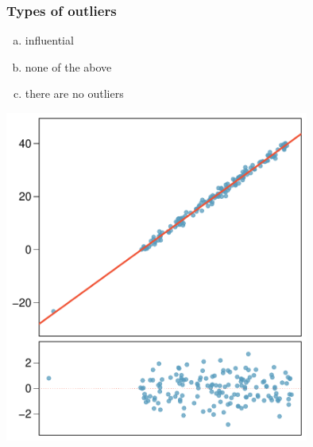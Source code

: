 \documentclass[notes,11pt, aspectratio=169]{beamer}
\begin{document}

\begin{frame}
\frametitle{Types of outliers}

{
\begin{enumerate}[(a)]
\item influential
\item none of the above
\item there are no outliers
\end{enumerate}
}
{
\begin{center}
\includegraphics[width=0.75\textwidth]{graphs/out6}
\end{center}
}

\end{frame}

\end{document}
